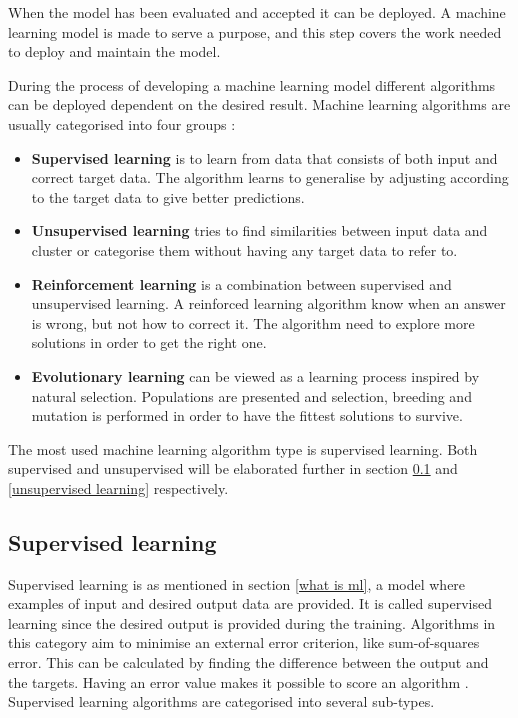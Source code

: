 \documentclass[english, a4paper]{report}
\begin{document}
{{{             \par 
             When the model has been evaluated and accepted it can be deployed. A machine learning model is made to serve a purpose, and this step covers the work needed to deploy and maintain the model.
             \par 
             During the process of developing a machine learning model different algorithms can be deployed dependent on the desired result. Machine learning algorithms are usually categorised into four groups \cite{mlMarsland}:     
             \begin{itemize}
                \item \textbf{Supervised learning} is to learn from data that consists of both input and correct target data. The algorithm learns to generalise by adjusting according to the target data to give better predictions.
                \item \textbf{Unsupervised learning} tries to find similarities between input data and cluster or categorise them without having any target data to refer to. 
                \item \textbf{Reinforcement learning} is a combination between supervised and unsupervised learning. A reinforced learning algorithm know when an answer is wrong, but not how to correct it. The algorithm need to explore more solutions in order to get the right one.
                \item \textbf{Evolutionary learning} can be viewed as a learning process inspired by natural selection. Populations are presented and selection, breeding and mutation is performed in order to have the fittest solutions to survive.
            \end{itemize}
            \par
            The most used machine learning algorithm type is supervised learning. Both supervised and unsupervised will be elaborated further in section \ref{supervised learning} and \ref{unsupervised learning} respectively.
        } 
        
        \subsection{Supervised learning}\label{supervised learning}
        {
            Supervised learning is as mentioned in section \ref{what is ml}, a model where examples of input and desired output data are provided. It is called supervised learning since the desired output is provided during the training. Algorithms in this category aim to minimise an external error criterion, like sum-of-squares error. This can be calculated by finding the difference between the output and the targets. Having an error value makes it possible to score an algorithm \cite{mlMarsland}. Supervised learning algorithms are categorised into several sub-types.
            
}}}
\end{document}
